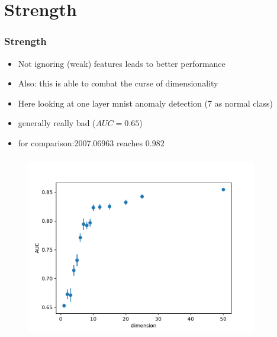 \documentclass[hyperref={pdfpagelabels=false}]{beamer}
\begin{document}
\newpage
\section{Strength}\label{sec:Strength}



\begin{frame}[label=Strength]
\frametitle{Strength}
\begin{itemize}

    \item Not ignoring (weak) features leads to better performance

    \item Also: this is able to combat the curse of dimensionality

    \item Here looking at one layer mnist anomaly detection (7 as normal class)

    \item generally really bad ($AUC = 0.65$)

    \item for comparison:2007.06963 reaches $0.982$


\end{itemize}
\end{frame}



\begin{frame}[label=]
\frametitle{}
\begin{figure}[H] 
  \centering
\includegraphics[width=0.9\textwidth]{../imgs/dimensional}
\label{fig:dimensional}
  \end{figure}


\end{frame}
\end{document}
